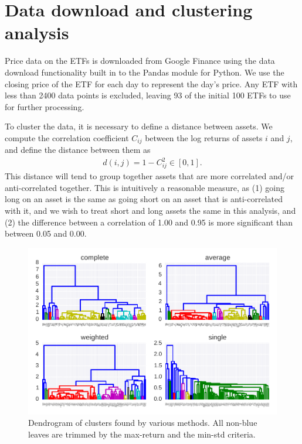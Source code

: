 \section{Data download and clustering analysis}

Price data on the ETFs is downloaded from Google Finance using the data download functionality built in to the Pandas module for Python.
We use the closing price of the ETF for each day to represent the day's price.
Any ETF with less than 2400 data points is excluded, leaving 93 of the initial 100 ETFs to use for further processing.

To cluster the data, it is necessary to define a distance between assets. We compute the correlation coefficient $C_{ij}$ between the log returns of assets $i$ and $j$, and define the distance between them as
\begin{gather}
d(i,j) = 1 - C_{ij}^2  \in [0, 1].
\end{gather}
This distance will tend to group together assets that are more correlated and/or anti-correlated together.
This is intuitively a reasonable measure, as (1) going long on an asset is the same as going short on an asset that is anti-correlated with it, and we wish to treat short and long assets the same in this analysis, and (2) the difference between a correlation of 1.00 and 0.95 is more significant than between 0.05 and 0.00.

\begin{figure}[tp]
\centering
\includegraphics{../pic/dendro_methods.pdf}
\caption{Dendrogram of clusters found by various methods. All non-blue leaves are trimmed by the max-return and the min-std criteria.}
\label{fig:dendrogram}
\end{figure}

